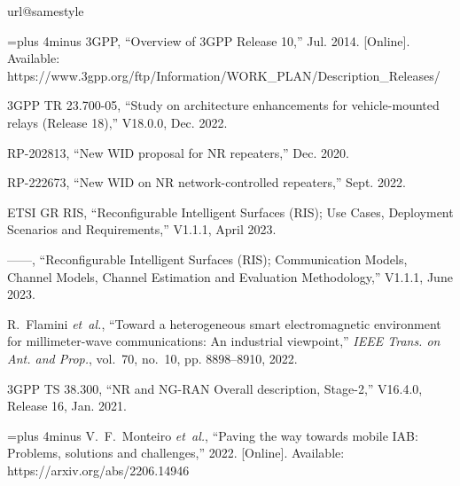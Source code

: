 \documentclass[lettersize,journal]{IEEEtran}
\begin{document}
{\renewcommand{\baselinestretch}{1.1}
\begin{thebibliography}{10}
\providecommand{\url}[1]{#1}
\csname url@samestyle\endcsname
\providecommand{\newblock}{\relax}
\providecommand{\bibinfo}[2]{#2}
\providecommand{\BIBentrySTDinterwordspacing}{\spaceskip=0pt\relax}
\providecommand{\BIBentryALTinterwordstretchfactor}{4}
\providecommand{\BIBentryALTinterwordspacing}{\spaceskip=\fontdimen2\font plus
\BIBentryALTinterwordstretchfactor\fontdimen3\font minus
  \fontdimen4\font\relax}
\providecommand{\BIBforeignlanguage}[2]{{%
\expandafter\ifx\csname l@#1\endcsname\relax
\typeout{** WARNING: IEEEtran.bst: No hyphenation pattern has been}%
\typeout{** loaded for the language `#1'. Using the pattern for}%
\typeout{** the default language instead.}%
\else
\language=\csname l@#1\endcsname
\fi
#2}}
\providecommand{\BIBdecl}{\relax}
\BIBdecl

\BIBentryALTinterwordspacing
3GPP, ``Overview of {3GPP Release} 10,'' Jul. 2014. [Online]. Available:
  \url{https://www.3gpp.org/ftp/Information/WORK_PLAN/Description_Releases/}
\BIBentrySTDinterwordspacing

{3GPP TR 23.700-05}, ``Study on architecture enhancements for vehicle-mounted
  relays {(Release 18)},'' V18.0.0, Dec. 2022.

RP-202813, ``New {WID} proposal for {NR} repeaters,'' Dec. 2020.

RP-222673, ``New {WID} on {NR} network-controlled repeaters,'' Sept. 2022.

{ETSI GR RIS}, ``{Reconfigurable Intelligent Surfaces (RIS); Use Cases,
  Deployment Scenarios and Requirements},'' V1.1.1, April 2023.

------, ``{Reconfigurable Intelligent Surfaces (RIS); Communication Models,
  Channel Models, Channel Estimation and Evaluation Methodology},'' V1.1.1,
  June 2023.

R.~Flamini \emph{et~al.}, ``Toward a heterogeneous smart electromagnetic
  environment for millimeter-wave communications: An industrial viewpoint,''
  \emph{IEEE Trans. on Ant. and Prop.}, vol.~70, no.~10, pp. 8898--8910, 2022.

{3GPP TS 38.300}, ``{NR and NG-RAN Overall description, Stage-2},'' V16.4.0,
  Release 16, Jan. 2021.

\BIBentryALTinterwordspacing
V.~F.~Monteiro \emph{et~al.}, ``Paving the way towards mobile {IAB}: Problems,
  solutions and challenges,'' 2022. [Online]. Available:
  \url{https://arxiv.org/abs/2206.14946}
\BIBentrySTDinterwordspacing


\end{thebibliography}}
\end{document}
